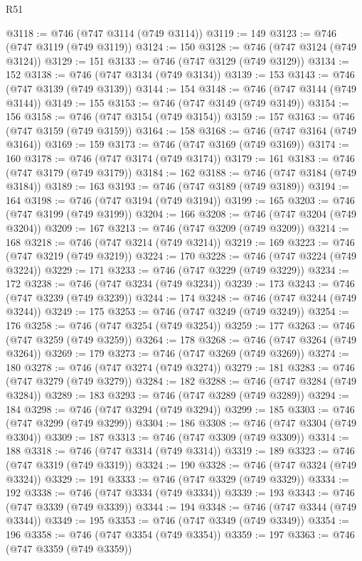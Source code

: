 \begin{lexlean}{R51}
\begin{coremodule}
@3118 := @746 (@747 @3114 (@749 @3114))
@3119 := 149
@3123 := @746 (@747 @3119 (@749 @3119))
@3124 := 150
@3128 := @746 (@747 @3124 (@749 @3124))
@3129 := 151
@3133 := @746 (@747 @3129 (@749 @3129))
@3134 := 152
@3138 := @746 (@747 @3134 (@749 @3134))
@3139 := 153
@3143 := @746 (@747 @3139 (@749 @3139))
@3144 := 154
@3148 := @746 (@747 @3144 (@749 @3144))
@3149 := 155
@3153 := @746 (@747 @3149 (@749 @3149))
@3154 := 156
@3158 := @746 (@747 @3154 (@749 @3154))
@3159 := 157
@3163 := @746 (@747 @3159 (@749 @3159))
@3164 := 158
@3168 := @746 (@747 @3164 (@749 @3164))
@3169 := 159
@3173 := @746 (@747 @3169 (@749 @3169))
@3174 := 160
@3178 := @746 (@747 @3174 (@749 @3174))
@3179 := 161
@3183 := @746 (@747 @3179 (@749 @3179))
@3184 := 162
@3188 := @746 (@747 @3184 (@749 @3184))
@3189 := 163
@3193 := @746 (@747 @3189 (@749 @3189))
@3194 := 164
@3198 := @746 (@747 @3194 (@749 @3194))
@3199 := 165
@3203 := @746 (@747 @3199 (@749 @3199))
@3204 := 166
@3208 := @746 (@747 @3204 (@749 @3204))
@3209 := 167
@3213 := @746 (@747 @3209 (@749 @3209))
@3214 := 168
@3218 := @746 (@747 @3214 (@749 @3214))
@3219 := 169
@3223 := @746 (@747 @3219 (@749 @3219))
@3224 := 170
@3228 := @746 (@747 @3224 (@749 @3224))
@3229 := 171
@3233 := @746 (@747 @3229 (@749 @3229))
@3234 := 172
@3238 := @746 (@747 @3234 (@749 @3234))
@3239 := 173
@3243 := @746 (@747 @3239 (@749 @3239))
@3244 := 174
@3248 := @746 (@747 @3244 (@749 @3244))
@3249 := 175
@3253 := @746 (@747 @3249 (@749 @3249))
@3254 := 176
@3258 := @746 (@747 @3254 (@749 @3254))
@3259 := 177
@3263 := @746 (@747 @3259 (@749 @3259))
@3264 := 178
@3268 := @746 (@747 @3264 (@749 @3264))
@3269 := 179
@3273 := @746 (@747 @3269 (@749 @3269))
@3274 := 180
@3278 := @746 (@747 @3274 (@749 @3274))
@3279 := 181
@3283 := @746 (@747 @3279 (@749 @3279))
@3284 := 182
@3288 := @746 (@747 @3284 (@749 @3284))
@3289 := 183
@3293 := @746 (@747 @3289 (@749 @3289))
@3294 := 184
@3298 := @746 (@747 @3294 (@749 @3294))
@3299 := 185
@3303 := @746 (@747 @3299 (@749 @3299))
@3304 := 186
@3308 := @746 (@747 @3304 (@749 @3304))
@3309 := 187
@3313 := @746 (@747 @3309 (@749 @3309))
@3314 := 188
@3318 := @746 (@747 @3314 (@749 @3314))
@3319 := 189
@3323 := @746 (@747 @3319 (@749 @3319))
@3324 := 190
@3328 := @746 (@747 @3324 (@749 @3324))
@3329 := 191
@3333 := @746 (@747 @3329 (@749 @3329))
@3334 := 192
@3338 := @746 (@747 @3334 (@749 @3334))
@3339 := 193
@3343 := @746 (@747 @3339 (@749 @3339))
@3344 := 194
@3348 := @746 (@747 @3344 (@749 @3344))
@3349 := 195
@3353 := @746 (@747 @3349 (@749 @3349))
@3354 := 196
@3358 := @746 (@747 @3354 (@749 @3354))
@3359 := 197
@3363 := @746 (@747 @3359 (@749 @3359))

\end{coremodule}
\end{lexlean}
